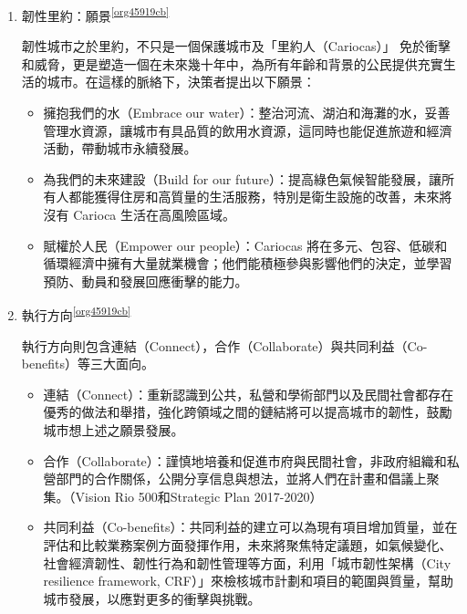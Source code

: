 \documentclass[a4paper,12pt]{article}
\begin{document}
\begin{enumerate}
\begin{enumerate}
\item 韌性里約：願景\textsuperscript{\ref{org45919cb}}
\label{sec:org75df39d}

韌性城市之於里約，不只是一個保護城市及「里約人（Cariocas）」 免於衝擊和威脅，更是塑造一個在未來幾十年中，為所有年齡和背景的公民提供充實生活的城市。在這樣的脈絡下，決策者提出以下願景：\\
\begin{itemize}
\item 擁抱我們的水（Embrace our water）：整治河流、湖泊和海灘的水，妥善管理水資源，讓城市有具品質的飲用水資源，這同時也能促進旅遊和經濟活動，帶動城市永續發展。\\
\item 為我們的未來建設（Build for our future）：提高綠色氣候智能發展，讓所有人都能獲得住房和高質量的生活服務，特別是衛生設施的改善，未來將沒有 Carioca 生活在高風險區域。\\
\item 賦權於人民（Empower our people）：Cariocas 將在多元、包容、低碳和循環經濟中擁有大量就業機會；他們能積極參與影響他們的決定，並學習預防、動員和發展回應衝擊的能力。\\
\end{itemize}

\item 執行方向\textsuperscript{\ref{org45919cb}}
\label{sec:org2041ec7}

執行方向則包含連結（Connect），合作（Collaborate）與共同利益（Co-benefits）等三大面向。\\
\begin{itemize}
\item 連結（Connect）：重新認識到公共，私營和學術部門以及民間社會都存在優秀的做法和舉措，強化跨領域之間的鏈結將可以提高城市的韌性，鼓勵城市想上述之願景發展。\\
\item 合作（Collaborate）：謹慎地培養和促進市府與民間社會，非政府組織和私營部門的合作關係，公開分享信息與想法，並將人們在計畫和倡議上聚集。（Vision Rio 500和Strategic Plan 2017-2020）\\
\item 共同利益（Co-benefits）：共同利益的建立可以為現有項目增加質量，並在評估和比較業務案例方面發揮作用，未來將聚焦特定議題，如氣候變化、社會經濟韌性、韌性行為和韌性管理等方面，利用「城市韌性架構（City resilience framework, CRF）」來檢核城市計劃和項目的範圍與質量，幫助城市發展，以應對更多的衝擊與挑戰。\\
\end{itemize}


\end{enumerate}
\end{enumerate}
\end{document}
